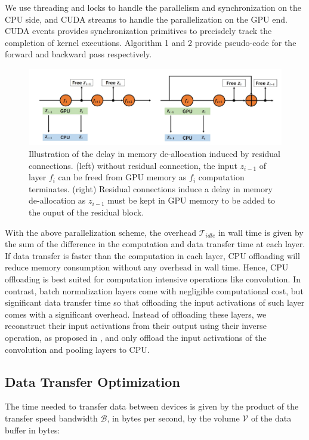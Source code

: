 \documentclass[11pt,onecolumn]{article}
\begin{document}
We use threading and locks to handle the parallelism and synchronization on the CPU side,
and CUDA streams to handle the parallelization on the GPU end. 
CUDA events provides synchronization primitives to precisdely track 
the completion of kernel executions.
Algorithm 1 and 2 provide pseudo-code for the forward and backward pass respectively.

\begin{figure}[h]
\includegraphics[width=\textwidth]{Figure3.png}
\caption{Illustration of the delay in memory de-allocation induced by residual connections.
(left) without residual connection, the input $z_{i-1}$ of layer $f_i$ can be freed from GPU memory 
as $f_i$ computation terminates. 
(right) Residual connections induce a delay in memory de-allocation
as $z_{i-1}$ must be kept in GPU memory to be added to the ouput of the residual block. 
}
\end{figure}

With the above parallelization scheme, the overhead $\mathcal{T}_{idle}$ in wall time 
is given by the sum of the difference in the computation and data transfer time at each layer.
If data transfer is faster than the computation in each layer, 
CPU offloading will reduce memory consumption without any overhead in wall time.
Hence, CPU offloading is best suited for computation intensive operations like convolution.
In contrast, batch normalization layers come with negligible computational cost,
but significant data transfer time so that offloading the input activations of 
such layer comes with a significant overhead.
Instead of offloading these layers, we reconstruct their input activations 
from their output using their inverse operation, as proposed in \cite{rota2018place},
and only offload the input activations of the convolution and pooling layers to CPU. 

 \subsection{Data Transfer Optimization}
The time needed to transfer data between devices is given by the product of the
transfer speed bandwidth $\mathcal{B}$, in bytes per second, by the volume 
$\mathcal{V}$ of the data buffer in bytes:
\end{document}
